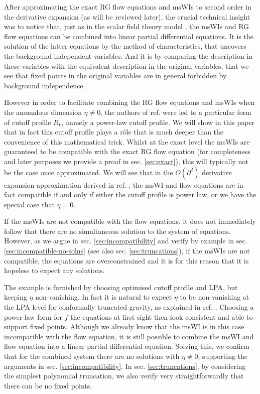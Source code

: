 \documentclass[11pt,draft]{book} %
\begin{document}
After approximating the exact RG flow equations and msWIs to second order in the derivative
expansion (as will be reviewed later),
the crucial technical insight was to notice that, just as in the scalar field theory model
\cite{Bridle:2013sra}, the msWIs and RG flow equations can be combined into linear partial
differential equations. It is the solution of the latter equations by the method of characteristics,
that uncovers the background independent variables.
And it is by comparing the description in these variables with the equivalent description
in the original variables, that we see that fixed points in the original variables are
in general forbidden by  background independence.

However in order to facilitate combining the RG flow equations and msWIs when the anomalous
dimension $\eta\ne0$, the authors of ref. \cite{Dietz:2015owa} were led to a particular form
of cutoff profile $R_k$, namely a power-law cutoff profile.
We will show in this paper that in fact this cutoff profile plays a r\^ole that is much
deeper than the convenience of this mathematical trick.
Whilst at the exact level the msWIs are guaranteed to be compatible with the exact RG
flow equation (for completeness and later purposes we provide a proof in sec. \ref{sec:exact}),
this will typically not be the case once approximated.
We will see that in the $O(\partial^2)$ derivative expansion approximation derived
in ref. \cite{Dietz:2015owa},
the msWI and flow equations are in fact compatible {if and only if} either the cutoff profile
is power law, or we have the special case that $\eta=0$.

If the msWIs are not compatible with the flow equations,
it does not immediately follow that there are no simultaneous solution to the system of equations.
However, as we argue in sec. \ref{sec:incompatibility} and verify by example in
sec. \ref{sec:incompatible-no-solns} (see also sec. \ref{sec:truncations}),
if the msWIs are not compatible, the equations are overconstrained and it is for this reason that
it is hopeless to expect any solutions.

The example is furnished by choosing optimised cutoff profile and LPA, but keeping $\eta$ non-vanishing.
In fact it is natural to expect $\eta$ to be non-vanishing at the LPA level for conformally truncated gravity,
as explained in ref. \cite{Dietz:2016gzg}.
Choosing a power-law form for $f$ the equations at first sight then look consistent and able
to support fixed points. Although we already know that the msWI is in this case incompatible with the
flow equation, it is still possible to combine the msWI and flow equation into a linear partial
differential equation. Solving this, we confirm that for the combined system there are no solutions
with $\eta\ne0$, supporting the arguments in sec. \ref{sec:incompatibility}.
In sec. \ref{sec:truncations}, by considering the simplest polynomial truncation,
we also verify very straightforwardly that there can be no fixed points.
\end{document}
